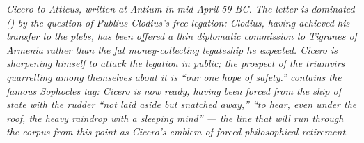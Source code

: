 
\textit{Cicero to Atticus, written at Antium in mid-April
59 BC. The letter is dominated () by the
question of Publius Clodius's free legation: Clodius,
having achieved his transfer to the plebs, has been
offered a thin diplomatic commission to Tigranes of
Armenia rather than the fat money-collecting legateship
he expected. Cicero is sharpening himself to attack the
legation in public; the prospect of the triumvirs
quarrelling among themselves about it is ``our one hope
of safety.''  contains the famous Sophocles
tag: Cicero is now ready, having been forced from the
ship of state with the rudder ``not laid aside but
snatched away,'' ``to hear, even under the roof, the
heavy raindrop with a sleeping mind'' --- the line that
will run through the corpus from this point as Cicero's
emblem of forced philosophical retirement.}

